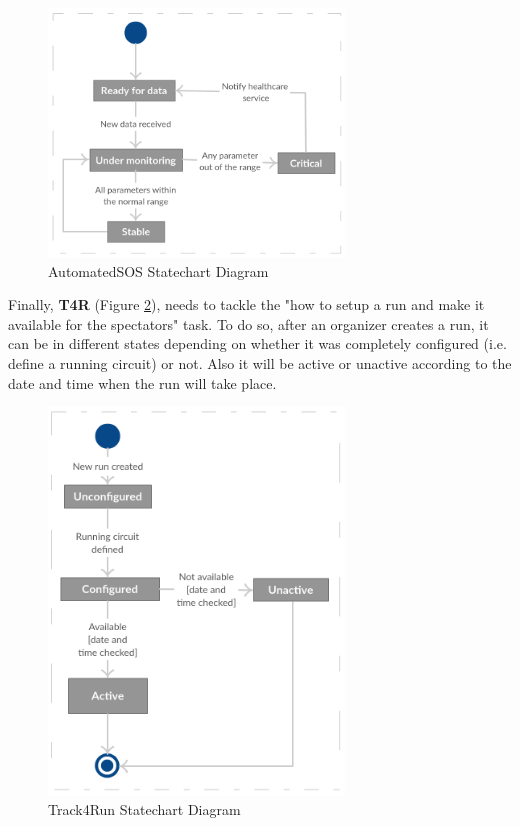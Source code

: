 \documentclass[a4paper, hidelinks, 12pt]{report}
\begin{document}
	\begin{figure}[H]
		\centering
		\includegraphics[width=0.7\textwidth]{Diagrams/asos_statechart.png}
		\caption[AutomatedSOS Statechart Diagram]{AutomatedSOS Statechart Diagram}
		\label{fig:asos_statechart}
	\end{figure}
	
	Finally, \textbf {T4R} (Figure \ref{fig:t4r_statechart}), needs to tackle the "how to setup a run and make it available for the spectators" task. To do so, after an organizer creates a run, it can be in different states depending on whether it was completely configured (i.e. define a running circuit) or not. Also it will be active or unactive according to the date and time when the run will take place.
	
	\begin{figure}[H]
		\centering
		\includegraphics[width=0.7\textwidth]{Diagrams/t4r_statechart.png}
		\caption[Track4Run Statechart Diagram]{Track4Run Statechart Diagram}
		\label{fig:t4r_statechart}
	\end{figure}
	
\end{document}
